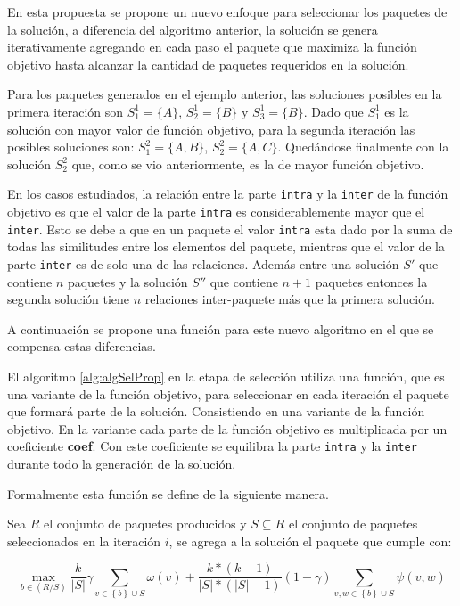 En esta propuesta se propone un nuevo enfoque para seleccionar los paquetes de la solución, a diferencia del algoritmo anterior, la solución se genera iterativamente agregando en cada paso el paquete que maximiza la función objetivo hasta alcanzar la cantidad de paquetes requeridos en la solución.

Para los paquetes generados en el ejemplo anterior, las soluciones posibles en la primera iteración son $S^{1}_{1}=\{A\}$, $S^{1}_{2}=\{B\}$ y $S^{1}_{3}=\{B\}$. Dado que $S^{1}_{1}$ es la solución con mayor valor de función objetivo, para la segunda iteración las posibles soluciones son:  $S^{2}_{1}=\{A,B\}$, $S^{2}_{2}=\{A,C\}$. Quedándose finalmente con la solución $S^{2}_{2}$ que, como se vio anteriormente, es la de mayor función objetivo.

En los casos estudiados, la relación entre la parte \texttt{intra} y la \texttt{inter} de la función objetivo es que el valor de la parte \texttt{intra} es considerablemente mayor que el \texttt{inter}. Esto se debe a que en un paquete el valor \texttt{intra} esta dado por la suma de todas las similitudes entre los elementos del paquete, mientras que el valor de la parte \texttt{inter} es de solo una de las relaciones. Además entre una solución $S'$ que contiene $n$ paquetes y la solución $S''$ que contiene $n+1$ paquetes entonces la segunda solución tiene $n$ relaciones inter-paquete más que la primera solución. 

A continuación se propone una función para este nuevo algoritmo en el que se compensa estas diferencias.

El algoritmo \ref{alg:algSelProp} en la etapa de selección utiliza una función, que es una variante de la función objetivo, para seleccionar en cada iteración el paquete que formará parte de la solución. Consistiendo en una variante de la función objetivo. En la variante cada parte de la función objetivo es multiplicada por un coeficiente \textbf{coef}. Con este coeficiente se equilibra la parte \texttt{intra} y la \texttt{inter} durante todo la generación de la solución.   

Formalmente esta función se define de la siguiente manera.

Sea $R$ el conjunto de paquetes producidos y $S \subseteq R$ el conjunto de paquetes seleccionados en la iteración $i$, se agrega a la solución el paquete que cumple con:

\begin{equation}
\max_{b \in (R/S)}{\dfrac{k}{|S|}} \gamma \sum_{v \in \left\{b\right\} \cup S}{\omega(v)} + \dfrac{k * (k-1)}{|S| * (|S|-1)} (1-\gamma) \sum_{v,w \in \left\{b\right\} \cup S}{\psi(v,w)}
\end{equation}

